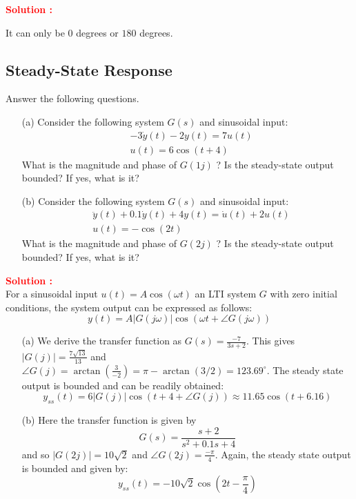 \documentclass[12pt]{article}
\begin{document}
\textbf{\textcolor{red}{Solution :}}

It can only be \(0\) degrees or \(180\) degrees.

\clearpage
\subsection{Steady-State Response}

Answer the following questions.
\begin{itemize}
    \item [(a)] Consider the following system $G(s)$ and sinusoidal input:
        \begin{align*}
        & -3 \dot{y}(t)-2 y(t)=7 u(t) \\
        & u(t)=6 \cos (t+4)
        \end{align*}
    What is the magnitude and phase of $G(1 j)$ ? Is the steady-state output bounded? If yes, what is it?
    \item[(b)] Consider the following system $G(s)$ and sinusoidal input:
        \begin{align*}
        & \ddot{y}(t)+0.1 \dot{y}(t)+4 y(t)=\dot{u}(t)+2 u(t) \\
        & u(t)=-\cos (2 t)
        \end{align*}
    What is the magnitude and phase of $G(2 j)$ ? Is the steady-state output bounded? If yes, what is it?
\end{itemize}

\textbf{\textcolor{red}{Solution :}} \\
For a sinusoidal input $u(t)=A \cos (\omega t)$ an LTI system $G$ with zero initial conditions, the system output can be expressed as follows:
$$
y(t)=A|G(j \omega)| \cos (\omega t+\angle G(j \omega))
$$
\begin{itemize}
    \item [(a)]  We derive the transfer function as $G(s)=\frac{-7}{3 s+2}$. This gives $|G(j)|=\frac{7 \sqrt{13}}{13}$ and $\angle G(j)=\arctan \left(\frac{3}{-2}\right)=\pi-\arctan (3 / 2)=123.69^{\circ}$. The steady state output is bounded and can be readily obtained:
$$
y_{s s}(t)=6|G(j)| \cos (t+4+\angle G(j)) \approx 11.65 \cos (t+6.16)
$$
    \item [(b)] Here the transfer function is given by
        $$ G(s)=\frac{s+2}{s^2+0.1s+4} $$
and so $|G(2j)| = 10 \sqrt{2}$ and $\angle G(2j) = \frac{-\pi}{4}$. Again, the steady state output is bounded and given by:
$$y_{ss}(t)=-10\sqrt{2}\cos{\left( 2 t -\frac{\pi}{4} \right)}$$
\end{itemize}
\end{document}
